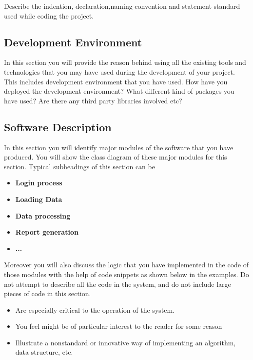 Describe the indention, declaration,naming convention and statement standard used while coding the project.

\subsection{Development Environment}

In this section you will provide the reason behind using all the existing tools and technologies that you may have used during the development of your project. This includes development environment that you have used. How have you deployed the development environment? What different kind of packages you have used? Are there any third party libraries involved etc?

\subsection{Software Description}

In this section you will identify major modules of the software that you have produced. You will show the class diagram of these major modules for this section. Typical subheadings of this section can be

\begin{itemize}
    \item \textbf{Login process}
    \item \textbf{Loading Data}
    \item \textbf{Data processing}
    \item \textbf{Report generation}
    \item \textbf{...}
\end{itemize}

Moreover you will also discuss the logic that you have implemented in the code of those modules with the help of code snippets as shown below in the examples. Do not attempt to describe all the code in the system, and do not include large pieces of code in this section.

\begin{itemize}
    \item Are especially critical to the operation of the system.
    \item You feel might be of particular interest to the reader for some reason
    \item Illustrate a nonstandard or innovative way of implementing an algorithm, data structure, etc.
\end{itemize}


